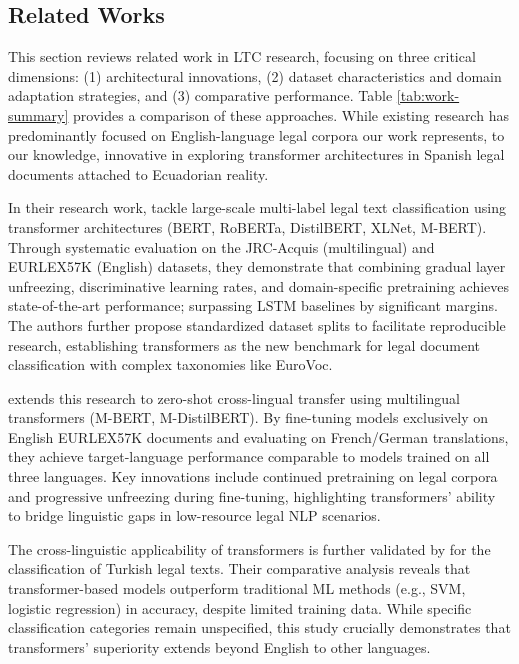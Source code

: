 \documentclass[runningheads]{llncs}
\begin{document}
\subsection{Related Works}
\label{sec:related-works}
This section reviews related work in LTC research, focusing on three
critical dimensions: (1) architectural innovations, (2) dataset
characteristics and domain adaptation strategies, and (3) comparative
performance. Table \ref{tab:work-summary} provides a  comparison of these
approaches. While existing research has predominantly focused on
English-language legal corpora our work represents, to our knowledge,
innovative in exploring transformer architectures in Spanish legal
documents attached to Ecuadorian reality.

In their research work, \cite{Shaheen2020} tackle large-scale
multi-label legal text classification using transformer architectures
(BERT, RoBERTa, DistilBERT, XLNet, M-BERT). Through systematic
evaluation on the JRC-Acquis (multilingual) and EURLEX57K (English)
datasets, they demonstrate that combining gradual layer unfreezing,
discriminative learning rates, and domain-specific pretraining
achieves state-of-the-art performance; surpassing LSTM baselines by
significant margins. The authors further propose standardized dataset
splits to facilitate reproducible research, establishing transformers
as the new benchmark for legal document classification with complex
taxonomies like EuroVoc.

\cite{Shaheen2021} extends this research to zero-shot cross-lingual
transfer using multilingual transformers (M-BERT, M-DistilBERT). By
fine-tuning models exclusively on English EURLEX57K documents and
evaluating on French/German translations, they achieve target-language
performance comparable to models trained on all three languages. Key
innovations include continued pretraining on legal corpora and
progressive unfreezing during fine-tuning, highlighting transformers'
ability to bridge linguistic gaps in low-resource legal NLP scenarios.

The cross-linguistic applicability of transformers is further
validated by \cite{Akca2022} for the classification of Turkish legal
texts. Their comparative analysis reveals that transformer-based
models outperform traditional ML methods (e.g., SVM, logistic
regression) in accuracy, despite limited training
data. While specific classification categories remain unspecified,
this study crucially demonstrates that transformers' superiority
extends beyond English to other languages.
\end{document}
